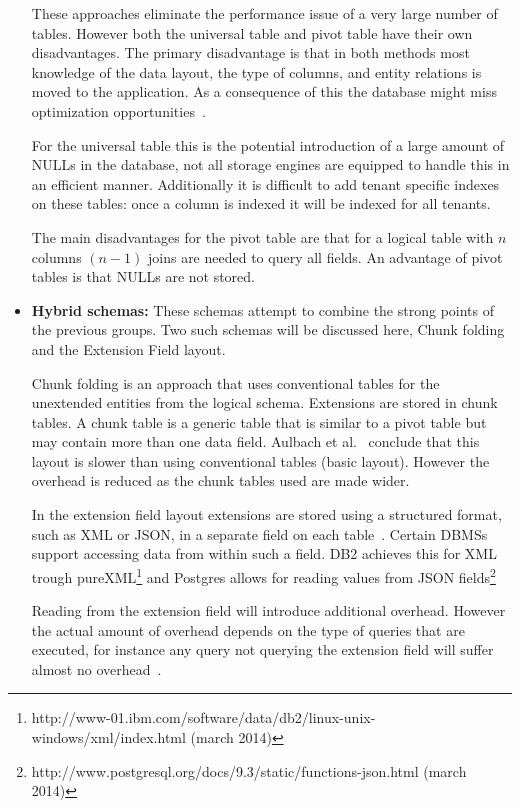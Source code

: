 \begin{itemize}
		These approaches eliminate the performance issue of a very large number of tables.
		However both the universal table and pivot table have their own disadvantages. 
		The primary disadvantage is that in both methods most knowledge of the data layout, the type of columns, and entity relations is moved to the application.
		As a consequence of this the database might miss optimization opportunities~\cite{schiller2011native}.

		For the universal table this is the potential introduction of a large amount of NULLs in the database, not all storage engines are equipped to handle this in an efficient manner. 
		Additionally it is difficult to add tenant specific indexes on these tables: once a column is indexed it will be indexed for all tenants.

		The main disadvantages for the pivot table are that for a logical table with $n$ columns $(n-1)$ joins are needed to query all fields. 
		An advantage of pivot tables is that NULLs are not stored.
	\item \textbf{Hybrid schemas:} These schemas attempt to combine the strong points of the previous groups. 
		Two such schemas will be discussed here, Chunk folding and the Extension Field layout.

		Chunk folding is an approach that uses conventional tables for the unextended entities from the logical schema.
		Extensions are stored in chunk tables. A chunk table is a generic table that is similar to a pivot table but may contain more than one data field.
		Aulbach et al.~\cite{aulbach2008multi} conclude that this layout is slower than using conventional tables (basic layout). 
		However the overhead is reduced as the chunk tables used are made wider. 

		In the extension field layout extensions are stored using a structured format, such as XML or JSON, in a separate field on each table~\cite{aulbach2009comparison}.
		Certain \acp{DBMS} support accessing data from within such a field. DB2 achieves this for XML trough pureXML\footnote{http://www-01.ibm.com/software/data/db2/linux-unix-windows/xml/index.html (march 2014)} and Postgres allows for reading values from JSON fields\footnote{http://www.postgresql.org/docs/9.3/static/functions-json.html (march 2014)}
		
		Reading from the extension field will introduce additional overhead. However the actual amount of overhead depends on the type of queries that are executed, for instance any query not querying the extension field will suffer almost no overhead~\cite{aulbach2009comparison}.
\end{itemize}

